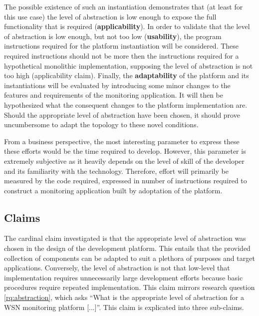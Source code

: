 The possible existence of such an instantiation demonstrates that (at least for this use case) the level of abstraction is low enough to expose the full functionality that is required  (\textbf{applicability}). In order to validate that the level of abstraction is low enough, but not too low (\textbf{usability}), the program instructions required for the platform instantiation will be considered. These required instructions should not be more then the instructions required for a hypothetical monolithic implementation, supposing the level of abstraction is not too high (applicability claim). Finally, the \textbf{adaptability} of the platform and its instantiations will be evaluated by introducing some minor changes to the features and requirements of the monitoring application. It will then be hypothesized what the consequent changes to the platform implementation are. Should the appropriate level of abstraction have been chosen, it should prove uncumbersome to adapt the topology to these novel conditions.

From a business perspective, the most interesting parameter to express these these efforts would be the time required to develop. However, this parameter is extremely subjective as it heavily depends on the level of skill of the developer and its familiarity with the technology. Therefore, effort will primarily be measured by the code required, expressed in number of instructions required to construct a monitoring application built by adoptation of the platform.

\subsection{Claims}
\label{sec:claims}
The cardinal claim investigated is that the appropriate level of abstraction was chosen in the design of the development platform. This entails that the provided collection of components can be adapted to suit a plethora of purposes and target applications. Conversely, the level of abstraction is not that low-level that implementation requires unnecessarily large development efforts because basic procedures require repeated implementation. This claim mirrors research question \ref{rq:abstraction}, which asks ``What is the appropriate level of abstraction for a WSN monitoring platform [...]''. This claim is explicated into three sub-claims.

